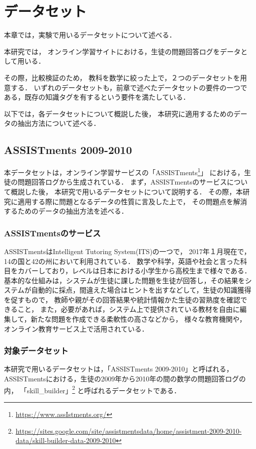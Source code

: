 \chapter{データセット}
\label{chap:dataset}
\fancyhf{}
\rhead{\thepage}
\cfoot{\thepage}


本章では，実験で用いるデータセットについて述べる．

本研究では，
オンライン学習サイトにおける，生徒の問題回答ログをデータとして用いる．

その際，比較検証のため，
教科を数学に絞った上で，２つのデータセットを用意する．
いずれのデータセットも，前章で述べたデータセットの要件の一つである，既存の知識タグを有するという要件を満たしている．

以下では，各データセットについて概説した後，
本研究に適用するためのデータの抽出方法について述べる．


\section{ASSISTments 2009-2010}
本データセットは，オンライン学習サービスの「ASSISTments\footnote{\url{https://www.assIstments.org/}}」
における，生徒の問題回答ログから生成されている．
まず，ASSISTmentsのサービスについて概説した後，
本研究で用いるデータセットについて説明する．
その際，本研究に適用する際に問題となるデータの性質に言及した上で，
その問題点を解消するためのデータの抽出方法を述べる．

\subsection{ASSISTmentsのサービス}
ASSISTmentsはIntelligent Tutoring System(ITS)の一つで，
2017年１月現在で，14の国と42の州において利用されている．
数学や科学，英語や社会と言った科目をカバーしており，レベルは日本における小学生から高校生まで様々である．
基本的な仕組みは，システムが生徒に課した問題を生徒が回答し，その結果をシステムが自動的に採点，間違えた場合はヒントを出すなどして，生徒の知識獲得を促すもので，
教師や親がその回答結果や統計情報かた生徒の習熟度を確認できること，
また，必要があれば，システム上で提供されている教材を自由に編集して，新たな問題を作成できる柔軟性の高さなどから，
様々な教育機関や，オンライン教育サービス上で活用されている．


\subsection{対象データセット}
本研究で用いるデータセットは，「ASSISTments 2009-2010」と呼ばれる，
ASSISTmentsにおける，生徒の2009年から2010年の間の数学の問題回答ログの内，
「skill\_builder」\footnote{\url{https://sites.google.com/site/assistmentsdata/home/assistment-2009-2010-data/skill-builder-data-2009-2010}}
と呼ばれるデータセットである．

